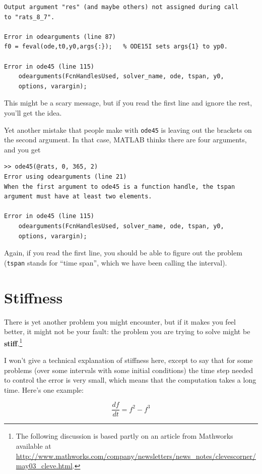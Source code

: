 \documentclass{book}
\begin{document}
\begin{verbatim}
Output argument "res" (and maybe others) not assigned during call
to "rats_8_7".

Error in odearguments (line 87)
f0 = feval(ode,t0,y0,args{:});   % ODE15I sets args{1} to yp0.

Error in ode45 (line 115)
    odearguments(FcnHandlesUsed, solver_name, ode, tspan, y0,
    options, varargin);
\end{verbatim}

This might be a scary message, but if you read the first line
and ignore the rest, you'll get the idea.

Yet another mistake that people make with {\tt ode45} is leaving
out the brackets on the second argument.  In that case, MATLAB
thinks there are four arguments, and you get

\begin{verbatim}
>> ode45(@rats, 0, 365, 2)
Error using odearguments (line 21)
When the first argument to ode45 is a function handle, the tspan
argument must have at least two elements.

Error in ode45 (line 115)
    odearguments(FcnHandlesUsed, solver_name, ode, tspan, y0,
    options, varargin);
\end{verbatim}

Again, if you read the first line, you should be able to figure
out the problem ({\tt tspan} stands for ``time span'', which we
have been calling the interval).


\section{Stiffness}

There is yet another problem you might encounter, but if it makes you
feel better, it might not be your fault: the problem you are trying to
solve might be {\bf stiff}.\footnote{The following discussion is based
partly on an article from Mathworks available at
\url{http://www.mathworks.com/company/newsletters/news_notes/clevescorner/may03_cleve.html}.}

I won't give a technical explanation of stiffness here, except
to say that for some problems (over some intervals with some initial
conditions) the time step needed to control the error is very small,
which means that the computation takes a long time.  Here's one
example:

\begin{equation}
\frac{df}{dt} = f^2 - f^3
\end{equation}
\end{document}
